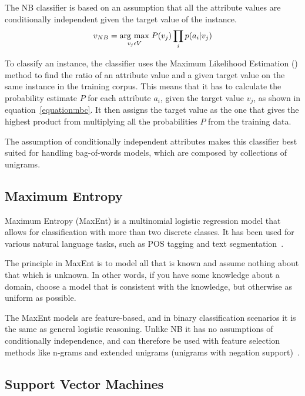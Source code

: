 The NB classifier is based on an assumption that all the attribute values are conditionally independent given the target value of the instance.
\begin{equation}
\label{equation:nbc}
v_{NB} = \underset{v_j \epsilon V}{\operatorname{arg}\,\operatorname{max}}\; P(v_j) \prod_{i} p(a_i|v_j)
\end{equation}

To classify an instance, the classifier uses the Maximum Likelihood Estimation () method to find the ratio of an attribute value and a given target value on the same instance in the training corpus. This means that it has to calculate the probability estimate $P$ for each attribute $a_i$, given the target value $v_j$, as shown in equation~\ref{equation:nbc}. It then assigns the target value as the one that gives the highest product from multiplying all the probabilities $P$ from the training data.

The assumption of conditionally independent attributes makes this classifier best suited for handling bag-of-words models, which are composed by collections of unigrams.

\subsection{Maximum Entropy}

Maximum Entropy (MaxEnt) is a multinomial logistic regression model that allows for classification with more than two discrete classes. It has been used for various natural language tasks, such as POS tagging and text segmentation~\citep{article:nigam}.

The principle in MaxEnt is to model all that is known and assume nothing about that which is unknown. In other words, if you have some knowledge about a domain, choose a model that is consistent with the knowledge, but otherwise as uniform as possible.

The MaxEnt models are feature-based, and in binary classification scenarios it is the same as general logistic reasoning. Unlike NB it has no assumptions of conditionally independence, and can therefore be used with feature selection methods like n-grams and extended unigrams (unigrams with negation support)~\citep{article:go}.

\subsection{Support Vector Machines}

